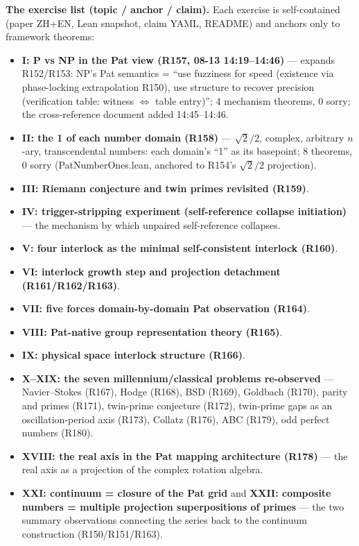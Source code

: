 \documentclass[sigplan,10pt,anonymous,review]{acmart}
\begin{document}
\textbf{The exercise list (topic / anchor / claim).} Each exercise is
self-contained (paper ZH+EN, Lean snapshot, claim YAML, README) and
anchors only to framework theorems:

\begin{itemize}
\item \textbf{I: P vs NP in the Pat view (R157, 08-13 14:19--14:46)} ---
expands R152/R153: NP's Pat semantics = ``use fuzziness for speed
(existence via phase-locking extrapolation R150), use structure to recover
precision (verification table: witness $\iff$ table entry)''; 4 mechanism
theorems, 0 sorry; the cross-reference document added 14:45--14:46.
\item \textbf{II: the 1 of each number domain (R158)} --- $\sqrt2/2$,
complex, arbitrary $n$-ary, transcendental numbers: each domain's ``1''
as its basepoint; 8 theorems, 0 sorry (PatNumberOnes.lean, anchored to
R154's $\sqrt2/2$ projection).
\item \textbf{III: Riemann conjecture and twin primes revisited (R159)}.
\item \textbf{IV: trigger-stripping experiment (self-reference collapse
initiation)} --- the mechanism by which unpaired self-reference collapses.
\item \textbf{V: four interlock as the minimal self-consistent interlock
(R160)}.
\item \textbf{VI: interlock growth step and projection detachment
(R161/R162/R163)}.
\item \textbf{VII: five forces domain-by-domain Pat observation (R164)}.
\item \textbf{VIII: Pat-native group representation theory (R165)}.
\item \textbf{IX: physical space interlock structure (R166)}.
\item \textbf{X--XIX: the seven millennium/classical problems re-observed}
--- Navier--Stokes (R167), Hodge (R168), BSD (R169), Goldbach (R170),
parity and primes (R171), twin-prime conjecture (R172), twin-prime gaps as
an oscillation-period axis (R173), Collatz (R176), ABC (R179), odd
perfect numbers (R180).
\item \textbf{XVIII: the real axis in the Pat mapping architecture (R178)}
--- the real axis as a projection of the complex rotation algebra.
\item \textbf{XXI: continuum = closure of the Pat grid} and
\textbf{XXII: composite numbers = multiple projection superpositions of
primes} --- the two summary observations connecting the series back to the
continuum construction (R150/R151/R163).
\end{itemize}
\end{document}
